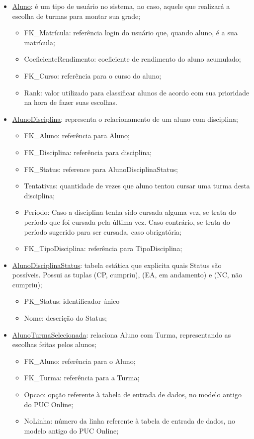 \documentclass[graduacao,brazil]{ThesisPUC}
\begin{document}
\begin{itemize}

	\item \underline{Aluno}: é um tipo de usuário no sistema, no caso, aquele que realizará a escolha de turmas para montar sua grade;
	\begin{itemize}
		\item FK\_Matrícula: referência login do usuário que, quando aluno, é a sua matrícula;
		\item CoeficienteRendimento: coeficiente de rendimento do aluno acumulado;
		\item FK\_Curso: referência para o curso do aluno;
		\item Rank: valor utilizado para classificar alunos de acordo com sua prioridade na hora de fazer suas escolhas.
	\end{itemize}

	\item \underline{AlunoDisciplina}: representa o relacionamento de um aluno com disciplina;
	\begin{itemize}
		\item FK\_Aluno: referência para Aluno;
		\item FK\_Disciplina: referência para disciplina;
		\item FK\_Status: reference para AlunoDisciplinaStatus;
		\item Tentativas: quantidade de vezes que aluno tentou cursar uma turma desta disciplina;
		\item Periodo: Caso a disciplina tenha sido cursada alguma vez, se trata do período que foi cursada pela última vez. Caso contrário, se trata do período sugerido para ser cursada, caso obrigatória;
		\item FK\_TipoDisciplina: referência para TipoDisciplina;
	\end{itemize}

	\item \underline{AlunoDisciplinaStatus}: tabela estática que explicita quais Status são possíveis. Possui as tuplas (CP, cumpriu), (EA, em andamento) e (NC, não cumpriu);
	\begin{itemize}
		\item PK\_Status: identificador único
		\item Nome: descrição do Status;
	\end{itemize}

	\item \underline{AlunoTurmaSelecionada}: relaciona Aluno com Turma, representando as escolhas feitas pelos alunos;
	\begin{itemize}
		\item FK\_Aluno:  referência para o Aluno;
		\item FK\_Turma: referência para a Turma;
		\item Opcao: opção referente à tabela de entrada de dados, no modelo antigo do PUC Online;
		\item NoLinha: número da linha referente à tabela de entrada de dados, no modelo antigo do PUC Online;
	\end{itemize}


\end{itemize}
\end{document}
